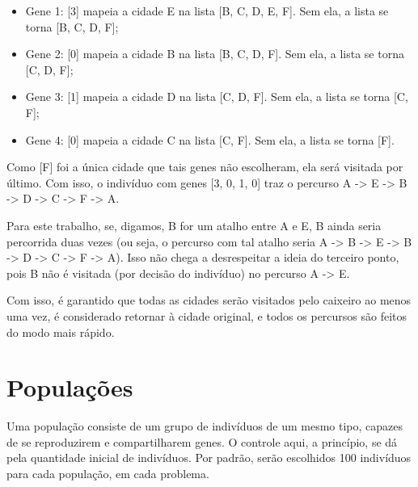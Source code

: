 \begin{itemize}
	\item Gene 1: [3] mapeia a cidade E na lista [B, C, D, E, F]. Sem ela, a lista se torna [B, C, D, F];
	\item Gene 2: [0] mapeia a cidade B na lista [B, C, D, F]. Sem ela, a lista se torna [C, D, F];
	\item Gene 3: [1] mapeia a cidade D na lista [C, D, F]. Sem ela, a lista se torna [C, F];
	\item Gene 4: [0] mapeia a cidade C na lista [C, F]. Sem ela, a lista se torna [F].
\end{itemize}

Como [F] foi a única cidade que tais genes não escolheram, ela será visitada por último. Com isso, o indivíduo com genes [3, 0, 1, 0] traz o percurso A -> E -> B -> D -> C -> F -> A.

Para este trabalho, se, digamos, B for um atalho entre A e E, B ainda seria percorrida duas vezes (ou seja, o percurso com tal atalho seria A -> B -> E -> B -> D -> C -> F -> A). Isso não chega a desrespeitar a ideia do terceiro ponto, pois B não é visitada (por decisão do indivíduo) no percurso A -> E.

Com isso, é garantido que todas as cidades serão visitados pelo caixeiro ao menos uma vez, é considerado retornar à cidade original, e todos os percursos são feitos do modo mais rápido.

\section{Populações}

Uma população consiste de um grupo de indivíduos de um mesmo tipo, capazes de se reproduzirem e compartilharem genes. O controle aqui, a princípio, se dá pela quantidade inicial de indivíduos. Por padrão, serão escolhidos 100 indivíduos para cada população, em cada problema.

